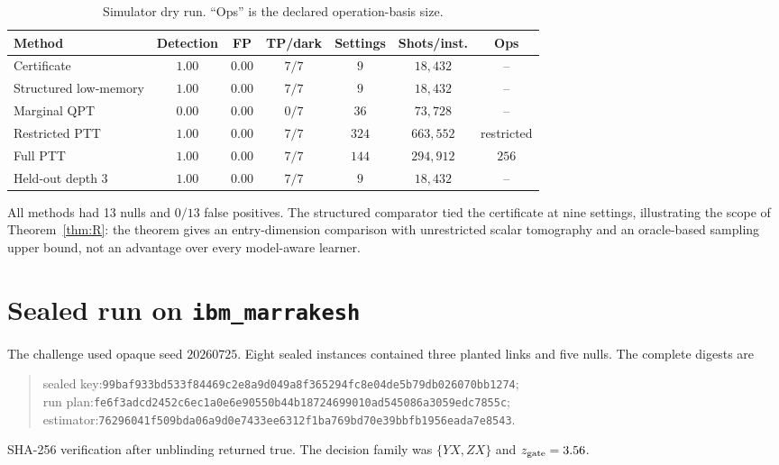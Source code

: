 \documentclass[aps,prl,reprint,superscriptaddress,nofootinbib]{revtex4-2}
\newcommand{\hashfour}[4]{\texttt{#1}\allowbreak\texttt{#2}\allowbreak\texttt{#3}\allowbreak\texttt{#4}}
\begin{document}
\begin{table}[t]
\caption{Simulator dry run.  ``Ops'' is the declared operation-basis size.}
\label{tab:dryrun}
\begin{ruledtabular}
\begin{tabular}{lcccccc}
Method & Detection & FP & TP/dark & Settings & Shots/inst. & Ops\\
\hline
Certificate & $1.00$ & $0.00$ & $7/7$ & $9$ & $18{,}432$ & --\\
Structured low-memory & $1.00$ & $0.00$ & $7/7$ & $9$ & $18{,}432$ & --\\
Marginal QPT & $0.00$ & $0.00$ & $0/7$ & $36$ & $73{,}728$ & --\\
Restricted PTT & $1.00$ & $0.00$ & $7/7$ & $324$ & $663{,}552$ & restricted\\
Full PTT & $1.00$ & $0.00$ & $7/7$ & $144$ & $294{,}912$ & $256$\\
Held-out depth 3 & $1.00$ & $0.00$ & $7/7$ & $9$ & $18{,}432$ & --\\
\end{tabular}
\end{ruledtabular}
\end{table}
All methods had 13 nulls and $0/13$ false positives.  The structured comparator tied the certificate at nine settings, illustrating the scope of Theorem~\ref{thm:R}: the theorem gives an entry-dimension comparison with unrestricted scalar tomography and an oracle-based sampling upper bound, not an advantage over every model-aware learner.

\section{Sealed run on \texttt{ibm\_marrakesh}}
\label{sec:marrakesh}

The challenge used opaque seed $20260725$.  Eight sealed instances contained three planted links and five nulls.  The complete digests are
\begin{quote}\small\raggedright
sealed key:\quad \hashfour{99baf933bd533f84}{469c2e8a9d049a8f}{365294fc8e04de5b}{79db026070bb1274};\\
run plan:\quad \hashfour{fe6f3adcd2452c6e}{c1a0e6e90550b44b}{18724699010ad545}{086a3059edc7855c};\\
estimator:\quad \hashfour{76296041f509bda0}{6a9d0e7433ee6312}{f1ba769bd70e39bb}{fb1956eada7e8543}.
\end{quote}
SHA-256 verification after unblinding returned true.  The decision family was $\{YX,ZX\}$ and $z_{\rm gate}=3.56$.
\end{document}
